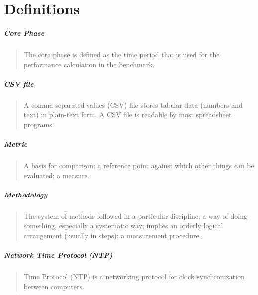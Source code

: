 \chapter{Definitions}
\label{sec:definitions}

\setlength{\parskip}{1pt}
\paragraph*{Core Phase}
\begin{quote}
The core phase is defined as the time period that is used for the performance calculation in the benchmark.
\end{quote}

\paragraph*{CSV file}
\begin{quote}
A comma-separated values (CSV) file stores tabular data (numbers and text) in plain-text form. A CSV file is readable by most spreadsheet programs.
\end{quote}

\paragraph*{Metric}
\begin{quote}
A basis for comparison; a reference point against which other things can be evaluated; a measure.
\end{quote}

\paragraph*{Methodology}
\begin{quote}
The system of methods followed in a particular discipline; a way of doing something, especially a systematic way; implies an orderly logical arrangement (usually in steps); a measurement procedure.
\end{quote}


\paragraph*{Network Time Protocol (NTP)}
\begin{quote}
Time Protocol (NTP) is a networking protocol for clock synchronization between computers.
\end{quote}

